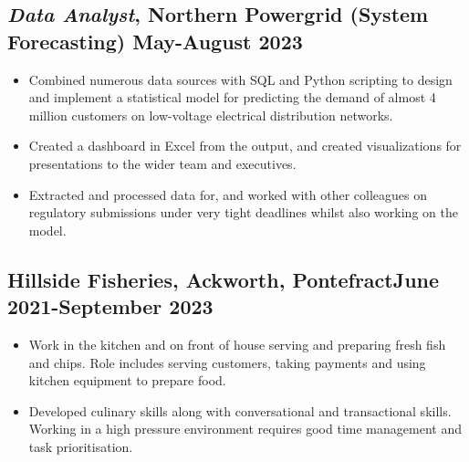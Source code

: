 \documentclass[9pt]{extarticle}
\begin{document}
\begin{minipage}{0.65\textwidth}
	\subsection{\textit{Data Analyst}, Northern Powergrid (System Forecasting) \hfill May-August 2023}

	\begin{itemize}
		\item Combined numerous data sources with SQL and Python scripting to design and implement a statistical model for predicting the demand of almost 4 million customers on low-voltage electrical distribution networks.\vspace{-.1cm}
		\item Created a dashboard in Excel from the output, and created visualizations for presentations to the wider team and executives. \vspace{-.1cm}
		\item Extracted and processed data for, and worked with other colleagues on regulatory submissions under very tight deadlines whilst also working on the model.
	\end{itemize}

	\vspace{-.5cm}







	\subsection{Hillside Fisheries, Ackworth, Pontefract\hfill June 2021-September 2023}
	\vspace{-.1cm}
	\begin{itemize}
		\item Work in the kitchen and on front of house serving and preparing fresh fish and chips. Role includes serving customers, taking payments and using kitchen equipment to prepare food.
		      \vspace{-.1cm}
		\item Developed culinary skills along with conversational and transactional skills. Working in a high pressure environment requires good time management and task prioritisation.
	\end{itemize}
	\vspace{-.5cm}





\end{minipage}
\end{document}

